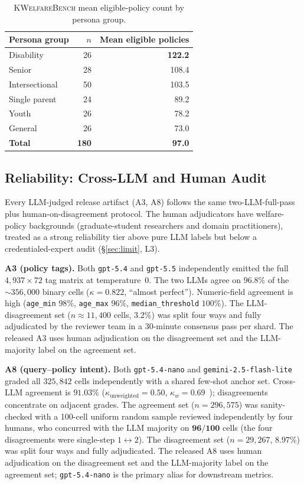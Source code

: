\documentclass{article}
\newcommand{\kwbench}{\textsc{KWelfareBench}}
\newcommand{\npolicy}{4{,}937}
\begin{document}
\begin{table}[t]
\centering\small
\begin{tabular}{lrr}
\toprule
Persona group & $n$ & Mean eligible policies \\
\midrule
Disability      & 26 & \textbf{122.2} \\
Senior          & 28 & 108.4 \\
Intersectional  & 50 & 103.5 \\
Single parent   & 24 & 89.2 \\
Youth           & 26 & 78.2 \\
General         & 26 & 73.0 \\
\midrule
\textbf{Total}  & \textbf{180} & \textbf{97.0} \\
\bottomrule
\end{tabular}
\caption{\kwbench{} mean eligible-policy count by persona group.}
\label{tab:group_stats}
\end{table}

\subsection{Reliability: Cross-LLM and Human Audit}
\label{sec:bench:reliability}

Every LLM-judged release artifact (A3, A8) follows the same
two-LLM-full-pass plus human-on-disagreement protocol. The human
adjudicators have welfare-policy backgrounds (graduate-student
researchers and domain practitioners), treated as a strong
reliability tier above pure LLM labels but below a
credentialed-expert audit (\S\ref{sec:limit}, L3).

\textbf{A3 (policy tags).} Both \texttt{gpt-5.4} and
\texttt{gpt-5.5} independently emitted the full
$\npolicy{}\times{}72$ tag matrix at temperature~0. The two LLMs
agree on $\mathbf{96.8\%}$ of the $\sim{}356{,}000$ binary cells
($\kappa{=}0.822$, ``almost perfect''). Numeric-field agreement is
high (\texttt{age\_min} $98\%$, \texttt{age\_max} $96\%$,
\texttt{median\_threshold} $100\%$). The LLM-disagreement set
($n{\approx}11{,}400$ cells, $3.2\%$) was split four ways and
fully adjudicated by the reviewer team in a 30-minute consensus
pass per shard. The released A3 uses human adjudication on the
disagreement set and the LLM-majority label on the agreement set.

\textbf{A8 (query--policy intent).} Both \texttt{gpt-5.4-nano} and
\texttt{gemini-2.5-flash-lite} graded all $325{,}842$ cells
independently with a shared few-shot anchor set. Cross-LLM
agreement is $\mathbf{91.03\%}$ ($\kappa_{\mathrm{unweighted}}{=}0.50$,
$\kappa_w{=}0.69$~\citep{cohen1968weightedkappa}); disagreements
concentrate on adjacent grades. The agreement set
($n{=}296{,}575$) was sanity-checked with a 100-cell uniform
random sample reviewed independently by four humans, who concurred
with the LLM majority on $\mathbf{96/100}$ cells (the four
disagreements were single-step $1\!\leftrightarrow\!2$). The
disagreement set ($n{=}29{,}267$, $8.97\%$) was split four ways and
fully adjudicated. The released A8 uses human adjudication on the
disagreement set and the LLM-majority label on the agreement set;
\texttt{gpt-5.4-nano} is the primary alias for downstream metrics.
\end{document}
